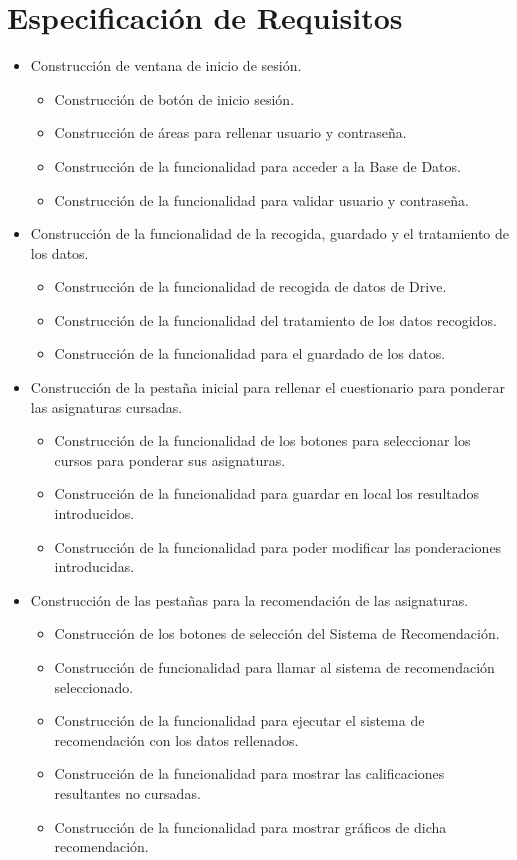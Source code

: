 \section{Especificación de Requisitos}
\begin{itemize}


\item Construcción de ventana de inicio de sesión. 
\begin{itemize}
\item Construcción de botón de inicio sesión. 
\item Construcción de áreas para rellenar usuario y contraseña.  
\item Construcción de la funcionalidad para acceder a la Base de Datos. 
\item Construcción de la funcionalidad para validar usuario y contraseña. 
\end{itemize}

\item Construcción de la funcionalidad de la recogida,  guardado y  el tratamiento de los datos. 
\begin{itemize}
\item Construcción de la funcionalidad de recogida de datos de Drive. 
\item Construcción de la funcionalidad del tratamiento de los datos recogidos. 
\item Construcción de la funcionalidad para el guardado de los datos. 

\end{itemize}

\item Construcción de la pestaña inicial para rellenar el cuestionario para ponderar las asignaturas cursadas. 
\begin{itemize}
\item Construcción de la funcionalidad de los botones para seleccionar los cursos para ponderar sus asignaturas. 
\item Construcción de la funcionalidad para guardar en local los resultados introducidos. 
\item Construcción de la funcionalidad para poder modificar las ponderaciones introducidas. 
\end{itemize}

\item Construcción de las pestañas para la recomendación de las asignaturas. 
\begin{itemize}
\item Construcción de los botones  de selección del Sistema de Recomendación.
\item Construcción de funcionalidad para llamar al sistema de recomendación  seleccionado. 
\item Construcción de la funcionalidad para ejecutar el sistema de recomendación con los datos rellenados. 
\item Construcción de la funcionalidad para mostrar las calificaciones resultantes no cursadas. 
\item Construcción de la funcionalidad para mostrar gráficos de dicha recomendación. 
\end{itemize}


\end{itemize}
